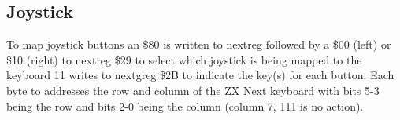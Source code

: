 \subsection{Joystick}

To map joystick buttons an \$80 is written to nextreg followed by a
\$00 (left) or \$10 (right) to nextreg \$29 to select which joystick
is being mapped to the keyboard 11 writes to nextgreg \$2B to indicate
the key(s) for each button. Each byte to addresses the row and column
of the ZX Next keyboard with bits 5-3 being the row and bits 2-0 being
the column (column 7, 111 is no action).
